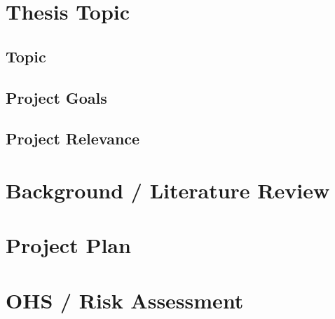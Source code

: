 \section{Thesis Topic}

\subsection{Topic}

\subsection{Project Goals}

\subsection{Project Relevance}

\section{Background / Literature Review}

\section{Project Plan}

\section{OHS / Risk Assessment}